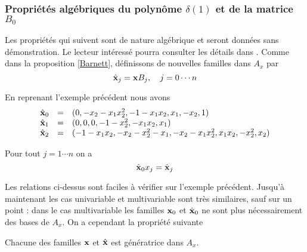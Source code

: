\documentclass{standalone}
\begin{document}
\subsubsection{Propriétés algébriques du polynôme $\delta(1)$ et de la matrice $B_0$}
Les propriétés qui suivent sont de nature algébrique et seront données sans démonstration. Le lecteur intéressé pourra consulter les détails dans \cite{jpc, CM}. Comme dans la proposition \ref{Barnett}, définissons de nouvelles familles dans $A_x$ par
\begin{equation}
		\hat{\bold{x}}_j  =  \bold{x}B_j, \quad j=0\cdots n
\end{equation}

\begin{exmp}
En reprenant l'exemple précédent nous avons
\begin{equation}
	\begin{array}{lll}
		\hat{\bold{x}}_0 & = & (0, -x_2 - x_1x_2^2, -1 - x_1x_2, x_1, -x_2, 1) \\
		\hat{\bold{x}}_1 & = & (0, 0, 0, -1 - x_2^2, -x_1x_2, x_1) \\
		\hat{\bold{x}}_2 & = & (-1 - x_1x_2, -x_2 - x_2^2 - x_1, - x_2 - x_1x_2^2, x_1x_2, -x_2^2, x_2)
	\end{array}
\end{equation}
\end{exmp}

\begin{prop}
\label{xj}
Pour tout $j=1\cdots n$ on a
\begin{equation}
    \hat{\bold{x}}_0x_j = \hat{\bold{x}}_j
\end{equation}
\end{prop}

Les relations ci-dessus sont faciles à vérifier sur l'exemple précédent. Jusqu'à maintenant les cas univariable et multivariable sont très similaires, sauf sur un point : dans le cas multivariable les familles $\bold{x}_0$ et $\hat{\bold{x}}_0$ ne sont plus nécessairement des bases de $A_x$. On a cependant la propriété suivante

\begin{prop}
Chacune des familles $\bold{x}$ et $\hat{\bold{x}}$ est génératrice dans $A_x$.
\end{prop}




\end{document}
